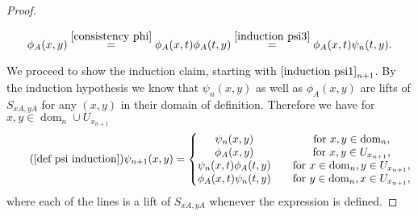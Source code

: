 \documentclass[b5paper,draft,openbib,12pt]{memoir}
\DeclareMathOperator{\dom}{dom}
\begin{document}
\begin{proof}
\begin{enumerate}
    \begin{equation}
  \phi_A(x,y)\overset{\eqref{consistency phi}}{=}\phi_A(x,t)\phi_A(t,y)\overset{\eqref{induction psi3}}{=}\phi_A(x,t)\psi_n(t,y).
  \end{equation}
  \end{enumerate}
We proceed to show the induction claim, 
starting with \(\eqref{induction psi1}_{n+1}\). By the induction 
hypothesis we know that \(\psi_n(x,y)\) as well as 
\(\phi_A(x,y)\) are lifts of \(S_{xA,yA}\) for any \((x,y)\) in their 
domain of definition. Therefore we have for \(x,y\in \dom_n \cup U_{x_{n+1}}\)
 \begin{equation}\tag{\ref{def psi induction}}
 \psi_{n+1}(x,y)=\left\{\begin{matrix}
 \psi_n(x,y) \quad &\text{for }x,y\in \dom_n,\\
 \phi_A(x,y) \quad &\text{for } x,y\in U_{x_{n+1}},\\
 \psi_n(x,t)\phi_A(t,y)\quad &\text{for } x\in \dom_n, y\in U_{x_{n+1}},\\
 \phi_A(x,t)\psi_n(t,y)\quad &\text{for } y\in \dom_n, x\in U_{x_{n+1}},
 \end{matrix} \right.
 \end{equation} 
where each of the lines is a lift of \(S_{xA,y A}\) whenever the expression is defined.



\end{proof}
\end{document}
